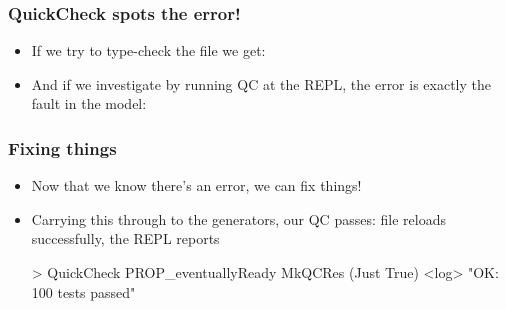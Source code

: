 \documentclass[compress,handout]{beamer}
\begin{document}
\begin{frame}
  \frametitle{QuickCheck spots the error!}

  \begin{itemize}
    \item<1-> If we try to type-check the file we get:
              \vspace*{-5mm}
    \item<2-> And if we investigate by running QC at the REPL, the error is
              exactly the fault in the model:
              \vspace*{-5mm}
              \vspace*{-2mm}
  \end{itemize}

\end{frame}


\begin{frame}[fragile]
  \frametitle{Fixing things}

  \begin{itemize}
    \item<1-> Now that we know there's an error, we can fix things!
  \end{itemize}

  \pause

  \vspace*{-5mm}
  \vspace*{-3mm}

  \pause

  \begin{itemize}
    \item Carrying this through to the generators, our QC passes: file reloads
          successfully, the REPL reports
          \vspace*{-5mm}
          \begin{idrislisting}
> QuickCheck PROP_eventuallyReady
MkQCRes (Just True) <log> "OK: 100 tests passed"
          \end{idrislisting}
  \end{itemize}

\end{frame}
\end{document}
